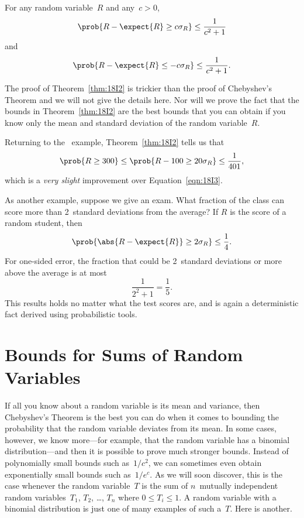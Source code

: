 \begin{theorem}\label{thm:18I2}
For any random variable~$R$ and any~$c > 0$,
\begin{equation*}
    \prob{R - \expect{R} \ge c \sigma_R} \le \frac{1}{c^2 + 1}
\end{equation*}
and
\begin{equation*}
    \prob{R - \expect{R} \le -c \sigma_R} \le \frac{1}{c^2 + 1}.
\end{equation*}
\end{theorem}

The proof of Theorem~\ref{thm:18I2} is trickier than the proof of
Chebyshev's Theorem and we will not give the details here.  Nor will
we prove the fact that
the bounds in Theorem~\ref{thm:18I2} are the best bounds that you can
obtain if you know only the mean and standard deviation of the random
variable~$R$.

Returning to the \IQ\ example, Theorem~\ref{thm:18I2} tells us that
\begin{equation*}
    \prob{R \ge 300} \le \prob{R - 100 \ge 20 \sigma_R} \le \frac{1}{401},
\end{equation*}
which is a \emph{very slight} improvement over Equation~\ref{eqn:18I3}.

As another example, suppose we give an exam.  What fraction of the
class can score more than 2~standard deviations from the average?  If
$R$ is the score of a random student, then
\begin{equation*}
    \prob{\abs{R - \expect{R}} \ge 2 \sigma_R} \le \frac{1}{4}.
\end{equation*}
For one-sided error, the fraction that could be 2~standard deviations
or more above the average is at most
\begin{equation*}
    \frac{1}{2^2 + 1} = \frac{1}{5}.
\end{equation*}
This results holds no matter what the test scores are, and is again a
deterministic fact derived using probabilistic tools.

\section{Bounds for Sums of Random Variables}

If all you know about a random variable is its mean and variance, then
Chebyshev's Theorem is the best you can do when it comes to bounding
the probability that the random variable deviates from its mean.  In
some cases, however, we know more---for example, that the random
variable has a binomial distribution---and then it is possible to
prove much stronger bounds.  Instead of polynomially small bounds such
as~$1/c^2$, we can sometimes even obtain exponentially small bounds
such as~$1/e^c$.  As we will soon discover, this is the case whenever
the random variable~$T$ is the sum of $n$~mutually independent random
variables~$T_1$, $T_2$, \dots, $T_n$ where $0 \le T_i \le 1$.  A
random variable with a binomial distribution is just one of many
examples of such a~$T$.  Here is another.

